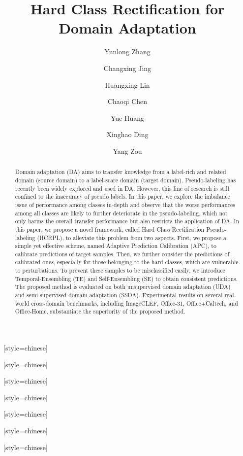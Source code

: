 \documentclass[a4paper,fleqn]{cas-dc}
\begin{document}
	\let\WriteBookmarks\relax
	\def\floatpagepagefraction{1}
	\def\textpagefraction{.001}
	
	\title [mode = title]{Hard Class Rectification for Domain Adaptation}                      
	
	
	
	\author[1]{Yunlong Zhang}[style=chinese]
	\author[1]{Changxing Jing}[style=chinese]
	\author[1]{Huangxing Lin }[style=chinese]
	\author[1]{Chaoqi Chen}[style=chinese]
	\author[1]{Yue Huang}[style=chinese]
	\cormark[1]
	\author[1]{Xinghao Ding}[style=chinese]
	\author[2]{Yang Zou}[style=chinese]
	
	
	\address[1]{Fujian Key Laboratory of Sensing and Computing for SmartCity, School of Informatics, Xiamen University, Xiamen, Fujian, 361005, China}
	\address[2]{Electrical and Computer Engineering, Carnegie Mellon University, Pittsburgh, PA, 15213, U.S.A.}
	
	
	
	
	\begin{abstract}
		Domain adaptation (DA) aims to transfer knowledge from a label-rich and related domain (source domain) to a label-scare domain (target domain).  Pseudo-labeling has recently been widely explored and used in DA. However, this line of research is still confined to the inaccuracy of pseudo labels. In this paper, we explore the imbalance issue of performance among classes in-depth and observe that the worse performances among all classes are likely to further deteriorate in the pseudo-labeling, which not only harms the overall transfer performance but also restricts the application of DA. In this paper,  we propose a novel framework, called Hard Class Rectification Pseudo-labeling (HCRPL), to alleviate this problem from two aspects. First, we propose a simple yet effective scheme, named Adaptive Prediction Calibration (APC), to calibrate predictions of target samples. Then, we further consider the predictions of calibrated ones, especially for those belonging to the hard classes, which are vulnerable to perturbations. To prevent these samples to be misclassified easily, we introduce Temporal-Ensembling (TE) and Self-Ensembling (SE) to obtain consistent predictions. The proposed method is evaluated on both unsupervised domain adaptation (UDA) and semi-supervised domain adaptation (SSDA). Experimental results on several real-world cross-domain benchmarks, including ImageCLEF, Office-31, Office+Caltech, and Office-Home, substantiate the superiority of the proposed method.
	\end{abstract}
	
\end{document}
